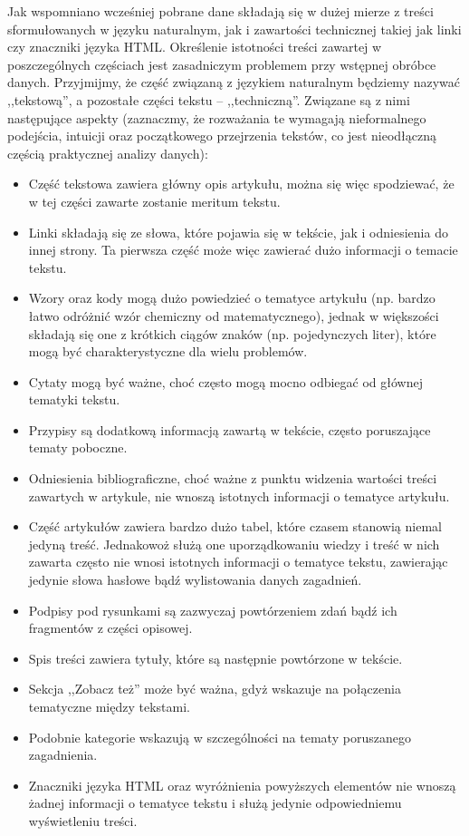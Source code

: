 \documentclass{praca1}
\begin{document}
Jak wspomniano wcześniej pobrane dane składają się w dużej mierze z treści sformułowanych w języku naturalnym, jak i zawartości technicznej takiej jak linki czy znaczniki języka HTML. Określenie istotności treści zawartej w poszczególnych częściach jest zasadniczym problemem przy wstępnej obróbce danych. Przyjmijmy, że część związaną z językiem naturalnym będziemy nazywać ,,tekstową'', a pozostałe części tekstu -- ,,techniczną''. Związane są z nimi następujące aspekty (zaznaczmy, że rozważania te wymagają nieformalnego podejścia, intuicji oraz początkowego przejrzenia tekstów, co jest nieodłączną częścią praktycznej analizy danych):
\begin{itemize}
\item Część tekstowa zawiera główny opis artykułu, można się więc spodziewać, że w tej części zawarte zostanie meritum tekstu.
\item Linki składają się ze słowa, które pojawia się w tekście, jak i odniesienia do innej strony. Ta pierwsza część może więc zawierać dużo informacji o temacie tekstu.
\item Wzory oraz kody mogą dużo powiedzieć o tematyce artykułu (np. bardzo łatwo odróżnić wzór chemiczny od matematycznego), jednak w większości składają się one z krótkich ciągów znaków (np. pojedynczych liter), które mogą być charakterystyczne dla wielu problemów.
\item Cytaty mogą być ważne, choć często mogą mocno odbiegać od głównej tematyki tekstu.
\item Przypisy są dodatkową informacją zawartą w tekście, często poruszające tematy poboczne.
\item Odniesienia bibliograficzne, choć ważne z punktu widzenia wartości treści zawartych w artykule, nie wnoszą istotnych informacji o tematyce artykułu.
\item Część artykułów zawiera bardzo dużo tabel, które czasem stanowią niemal jedyną treść. Jednakowoż służą one uporządkowaniu wiedzy i treść w nich zawarta często nie wnosi istotnych informacji o tematyce tekstu, zawierając jedynie słowa hasłowe bądź wylistowania danych zagadnień.
\item Podpisy pod rysunkami są zazwyczaj powtórzeniem zdań bądź ich fragmentów z części opisowej.
\item Spis treści zawiera tytuły, które są następnie powtórzone w tekście.
\item Sekcja ,,Zobacz też'' może być ważna, gdyż wskazuje na połączenia tematyczne między tekstami.
\item Podobnie kategorie wskazują w szczególności na tematy poruszanego zagadnienia.
\item Znaczniki języka HTML oraz wyróżnienia powyższych elementów nie wnoszą żadnej informacji o tematyce tekstu i służą jedynie odpowiedniemu wyświetleniu treści.
\end{itemize}
\end{document}
